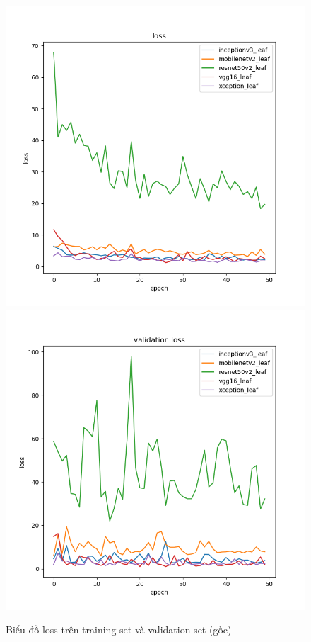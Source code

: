 \documentclass[a4paper,14pt]{extarticle}
\begin{document}
		\begin{figure}[H]
			\centering
			\includegraphics[scale=0.4]{images/leaf_loss.png}
			\includegraphics[scale=0.4]{images/leaf_val_loss.png}
			\caption{Biểu đồ loss trên training set và validation set (gốc)}
		\end{figure}
\end{document}
